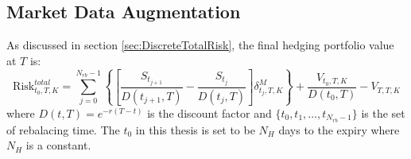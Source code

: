 \documentclass[letterpaper,12pt,titlepage,oneside,final]{book}
\numberwithin{equation}{section}
\theoremstyle{definition}
\newcommand{\Smkt}{S}
\begin{document}
\subsection{Market Data Augmentation}
\label{sec:DataAugmentation}
As discussed in section \ref{sec:DiscreteTotalRisk}, the final hedging portfolio value at $T$ is:
\begin{equation}
\text{Risk}^{total}_{t_0,T,K}=\sum_{j=0}^{N_{rb}-1}\left\{ \left[\frac{\Smkt_{t_{j+1}}}{D(t_{j+1},T)}-\frac{\Smkt_{t_{j}}}{D(t_{j},T)}\right] \delta^M_{t_j,T,K} \right\}+\frac{V_{t_0,T,K}}{D(t_{0},T)}-V_{T,T,K}
\end{equation}
where
$D(t,T)=e^{-r(T-t)}$ is the discount factor and $\{t_0,t_1, \dots, t_{N_{rb}-1}\}$ is the set of rebalacing time. The $t_0$ in this thesis is set to be $N_H$ days to the expiry where $N_H$  is a constant. 

\end{document}
